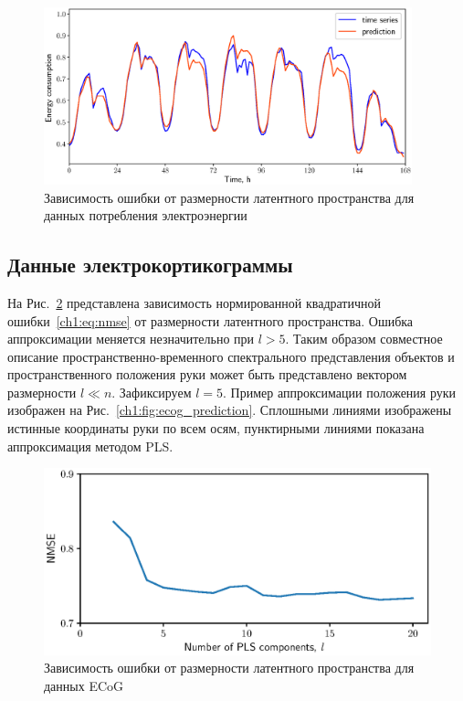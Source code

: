 \begin{figure}[ht]
	\centering
	\includegraphics[width=0.95\textwidth]{figs/ch1/energy_prediction}
	\caption{Зависимость ошибки от размерности латентного пространства для данных потребления электроэнергии}
	\label{ch1:fig:energy_prediction}
\end{figure}

\subsection*{Данные электрокортикограммы}

На Рис.~\ref{ch1:fig:ecog_n_comp} представлена зависимость нормированной квадратичной ошибки~\eqref{ch1:eq:nmse} от размерности латентного пространства. Ошибка аппроксимации меняется незначительно при $l > 5$.
Таким образом совместное описание пространственно-временного спектрального представления объектов и пространственного положения руки может быть представлено вектором размерности $l \ll n$.
Зафиксируем $l = 5$. 
Пример аппроксимации положения руки изображен на Рис.~\ref{ch1:fig:ecog_prediction}. 
Сплошными линиями изображены истинные координаты руки по всем осям, пунктирными линиями показана аппроксимация методом PLS.
 
\begin{figure}[ht]
	\centering
	\includegraphics[width=0.75\linewidth]{figs/ch1/ecog_n_comp}	
	\caption{Зависимость ошибки от размерности латентного пространства для данных ECoG}
	\label{ch1:fig:ecog_n_comp}
\end{figure}

